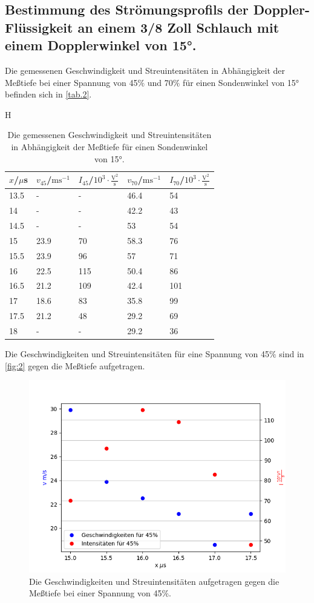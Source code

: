 \subsection{Bestimmung des Strömungsprofils der Doppler-Flüssigkeit an einem 3/8 Zoll Schlauch
mit einem Dopplerwinkel von 15°.}
Die gemessenen Geschwindigkeit und Streuintensitäten in Abhängigkeit der Meßtiefe bei einer Spannung von 45$\%$ und 70$\%$ für einen Sondenwinkel von 15° befinden sich in \autoref{tab.2}.
\begin{table}{H}
  \centering
  \caption{Die gemessenen Geschwindigkeit und Streuintensitäten in Abhängigkeit der Meßtiefe für einen Sondenwinkel von 15°.}
  \begin{tabular}{l|l|l|l|l}
  $x$/$\mu$s & $v_{45}$/$\textrm{ms}^{-1}$ & $I_{45}$/$10^3\cdot\frac{\textrm{V}^2}{\textrm{s}}$ & $v_{70}$/$\textrm{ms}^{-1}$ & $I_{70}$/$10^3\cdot\frac{\textrm{V}^2}{\textrm{s}}$\\\hline
  13.5 & - & - & 46.4 & 54\\
  14 & - & - & 42.2 & 43\\
  14.5 & - & - & 53 & 54\\
  15 & 23.9 & 70 & 58.3 & 76\\
  15.5 & 23.9 & 96 & 57 & 71\\
  16 & 22.5 & 115 & 50.4 & 86\\
  16.5 & 21.2 & 109 & 42.4 & 101\\
  17 & 18.6 & 83 & 35.8 & 99\\
  17.5 & 21.2 & 48 & 29.2 & 69\\
  18 & - & - & 29.2 & 36\\
  \end{tabular}
  \label{tab.2}
\end{table}
Die Geschwindigkeiten und Streuintensitäten für eine Spannung von 45$\%$ sind in \autoref{fig:2} gegen die Meßtiefe aufgetragen.
\begin{figure}[H]
  \centering
  \includegraphics[width=12cm]{content/2}
  \caption{Die Geschwindigkeiten und Streuintensitäten aufgetragen gegen die Meßtiefe bei einer Spannung von 45$\%$.}
  \label{fig:2}
\end{figure}

